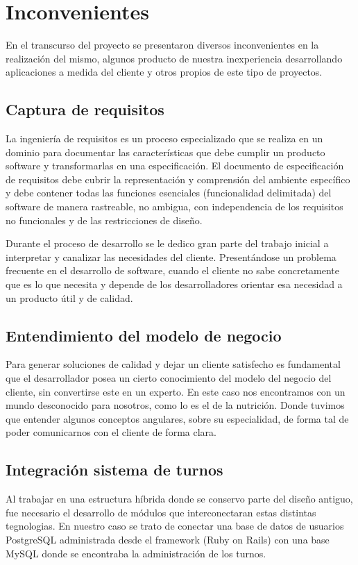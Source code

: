\documentclass[runningheads,a4paper,spanish]{llncs}
\begin{document}
\section{Inconvenientes}
En el transcurso del proyecto se presentaron diversos inconvenientes en la realización del mismo, algunos producto de nuestra inexperiencia desarrollando aplicaciones a medida del cliente y otros propios de este tipo de proyectos.

\subsection{Captura de requisitos}
La ingeniería de requisitos es un proceso especializado que se realiza en un dominio para documentar las características que debe cumplir un producto software y transformarlas en una especificación. El documento de especificación de requisitos debe cubrir la representación y comprensión del ambiente específico y debe contener todas las funciones esenciales (funcionalidad delimitada) del software de manera rastreable, no ambigua, con independencia de los requisitos no funcionales y de las restricciones de diseño.\cite{lopez}

Durante el proceso de desarrollo se le dedico gran parte del trabajo inicial a interpretar y canalizar las necesidades del cliente. Presentándose un problema frecuente en el desarrollo de software, cuando el cliente no sabe concretamente que es lo que necesita y depende de los desarrolladores orientar esa necesidad a un producto útil y de calidad. 

\subsection{Entendimiento del modelo de negocio}
Para generar soluciones de calidad y dejar un cliente satisfecho es fundamental que el desarrollador posea un cierto conocimiento del modelo del negocio del cliente, sin convertirse este en un experto. En este caso nos encontramos con un mundo desconocido para nosotros, como lo es el de la nutrición. Donde tuvimos que entender algunos conceptos angulares, sobre su especialidad, de forma tal de poder comunicarnos con el cliente de forma clara.

\subsection{Integración sistema de turnos}
Al trabajar en una estructura híbrida donde se conservo parte del diseño antiguo, fue necesario el desarrollo de módulos que interconectaran estas distintas tegnologias. En nuestro caso se trato de conectar una base de datos de usuarios PostgreSQL administrada desde el framework (Ruby on Rails) con una base MySQL donde se encontraba la administración de los turnos. 
\end{document}
